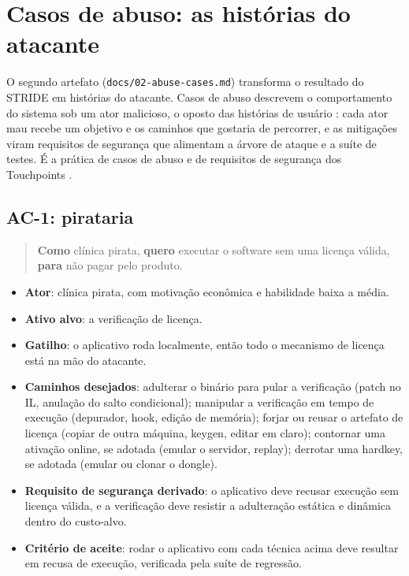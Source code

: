 \section{Casos de abuso: as histórias do atacante}
\label{sec:abuso}

O segundo artefato (\texttt{docs/02-abuse-cases.md}) transforma o resultado do STRIDE em histórias do atacante. Casos de abuso descrevem o comportamento do sistema sob um ator malicioso, o oposto das histórias de usuário \parencite{sindre2005,mcgraw2006}: cada ator mau recebe um objetivo e os caminhos que gostaria de percorrer, e as mitigações viram requisitos de segurança que alimentam a árvore de ataque e a suíte de testes. É a prática de casos de abuso e de requisitos de segurança dos Touchpoints \parencite{mcgraw2006}.

\subsection{AC-1: pirataria}

\begin{quote}
\textbf{Como} clínica pirata, \textbf{quero} executar o software sem uma licença válida, \textbf{para} não pagar pelo produto.
\end{quote}

\begin{itemize}
\item \textbf{Ator}: clínica pirata, com motivação econômica e habilidade baixa a média.
\item \textbf{Ativo alvo}: a verificação de licença.
\item \textbf{Gatilho}: o aplicativo roda localmente, então todo o mecanismo de licença está na mão do atacante.
\item \textbf{Caminhos desejados}: adulterar o binário para pular a verificação (patch no IL, anulação do salto condicional); manipular a verificação em tempo de execução (depurador, hook, edição de memória); forjar ou reusar o artefato de licença (copiar de outra máquina, keygen, editar em claro); contornar uma ativação online, se adotada (emular o servidor, replay); derrotar uma hardkey, se adotada (emular ou clonar o dongle).
\item \textbf{Requisito de segurança derivado}: o aplicativo deve recusar execução sem licença válida, e a verificação deve resistir a adulteração estática e dinâmica dentro do custo-alvo.
\item \textbf{Critério de aceite}: rodar o aplicativo com cada técnica acima deve resultar em recusa de execução, verificada pela suíte de regressão.
\end{itemize}

